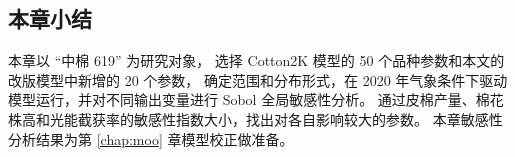 \begin{spacing}{}
    \section{本章小结}
    本章以 “中棉 619” 为研究对象，%
    选择 Cotton2K 模型的 50 个品种参数和本文的改版模型中新增的 20 个参数，%
    确定范围和分布形式，在 2020 年气象条件下驱动模型运行，并对不同输出变量进行 Sobol 全局敏感性分析。%
    通过皮棉产量、棉花株高和光能截获率的敏感性指数大小，找出对各自影响较大的参数。%
    本章敏感性分析结果为第 \ref{chap:moo} 章模型校正做准备。
\end{spacing}